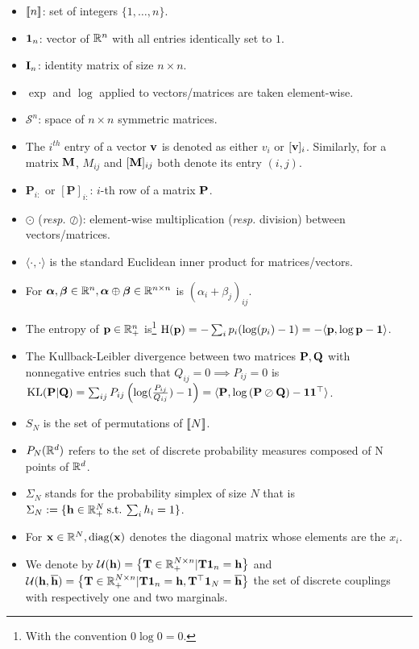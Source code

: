 \begin{itemize}
	\item ${[\![n]\!]}$: set of integers $\{1,\dots,n\}$.
	\item $\bm{1}_{n}$: vector of $\mathbb{R}^{n}$ with all entries identically set to $1$.
	\item ${\mathbf{I}}_n$: identity matrix of size $n \times n$.
    \item $\exp$ and $\log$ applied to vectors/matrices are taken element-wise.
    \item $\mathcal{S}^n$: space of $n \times n$ symmetric matrices.
    \item The $i^{th}$ entry of a vector ${\mathbf{v}}$ is denoted as either $v_i$ or $[{\mathbf{v}}]_i$.
	Similarly, for a matrix ${\mathbf{M}}$, $M_{ij}$ and $[{\mathbf{M}}]_{ij}$ both denote its entry $(i,j)$.
    \item $\mathbf{P}_{i:}$ or $[\mathbf{P}]_{i:}$: $i$-th row of a matrix $\mathbf{P}$.
    \item $\odot$ (\textit{resp.} $\oslash$): element-wise multiplication (\textit{resp.} division) between vectors/matrices.
    \item $\langle \cdot, \cdot \rangle$ is the standard Euclidean inner product for matrices/vectors.
    \item For $\bm{\alpha}, \bm{\beta} \in \mathbb{R}^n, \bm{\alpha} \oplus \bm{\beta} \in \mathbb{R}^{n \times n}$ is $(\alpha_i + \beta_j)_{ij}$.
    \item The entropy of $\mathbf{p} \in \mathbb{R}^{n}_+$ is\footnote{With the convention $0 \log 0 = 0$.} $\operatorname{H}(\mathbf{p}) = -\sum_{i} p_i(\log(p_i)-1) = -\langle \mathbf{p}, \log \mathbf{p} - \bm{1} \rangle$.
    \item The Kullback-Leibler divergence between two matrices $\mathbf{P}, \mathbf{Q}$ with nonnegative entries such that $Q_{ij} = 0 \implies P_{ij}=0$ is $\operatorname{KL}(\mathbf{P} | \mathbf{Q}) = \sum_{ij} P_{ij}\left(\log(\frac{P_{ij}}{Q_{ij}})-1\right) = \langle \mathbf{P}, \log \left(\mathbf{P} \oslash \mathbf{Q} \right) - \bm{1}\bm{1}^\top \rangle$.
    \item $S_N$ is the set of permutations of ${[\![N]\!]}$.
    \item $P_N(\mathbb{R}^d)$ refers to the set of discrete probability measures composed of N points of $\mathbb{R}^d$.
    \item $\Sigma_N$ stands for the probability simplex of size $N$ that is $\Sigma_N := \{{\mathbf{h}} \in \mathbb{R}^N_+ \: \text{s.t.} \: \sum_i h_i = 1 \}$.
    \item For ${\mathbf{x}} \in \mathbb{R}^{N}, \operatorname{diag}({\mathbf{x}})$ denotes the diagonal matrix whose elements are the $x_i$.
    \item We denote by ${\mathcal{U}}({\mathbf{h}}) = \left\{ {\mathbf{T}} \in \mathbb{R}_+^{N \times n} | {\mathbf{T}} \bm{1}_n = {\mathbf{h}} \right\}$ and ${\mathcal{U}}({\mathbf{h}}, \overline{{\mathbf{h}}}) = \left\{ {\mathbf{T}} \in \mathbb{R}_+^{N \times n} | {\mathbf{T}} \bm{1}_n = {\mathbf{h}}, {\mathbf{T}}^\top \bm{1}_N = \overline{{\mathbf{h}}} \right\}$ the set of discrete couplings with respectively one and two marginals.

\end{itemize}
